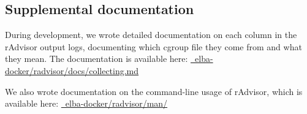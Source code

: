 \documentclass[a4paper,11pt]{article}
\begin{document}
\subsection{Supplemental documentation}

During development, we wrote detailed documentation on each column in the rAdvisor output logs,
documenting which cgroup file they come from and what they mean.
The documentation is available here: 
\href{https://github.com/elba-docker/radvisor/blob/develop/docs/collecting.md}{\faGithub~elba-docker/radvisor/docs/collecting.md}

We also wrote documentation on the command-line usage of rAdvisor, which is available here:
\href{https://github.com/elba-docker/radvisor/tree/develop/man}{\faGithub~elba-docker/radvisor/man/}
\end{document}
